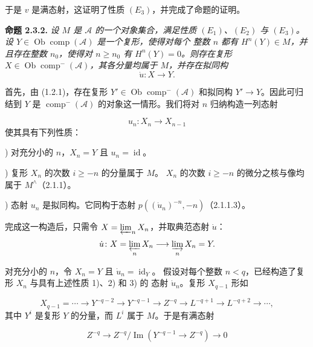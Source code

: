 \clearpage
{}%
\begingroup\small\setlength{\parskip}{0pt}\setlength{\emergencystretch}{1.5em}
\setlength{\abovedisplayskip}{4pt plus 2pt minus 2pt}%
\setlength{\belowdisplayskip}{4pt plus 2pt minus 2pt}%

于是 $v$ 是满态射，这证明了性质 $(E_3)$，并完成了命题的证明。

\medskip\noindent\textbf{命题 2.3.2.}
\textit{设 $M$ 是 $\mathcal A$ 的一个对象集合，满足性质
$(E_1)$、$(E_2)$ 与 $(E_3)$。设
$Y\in\operatorname{Ob}\operatorname{comp}(\mathcal A)$ 是一个复形，使得对每个
整数 $n$ 都有 $H^n(Y)\in M$，并且存在整数 $n_0$，使得对
$n\geq n_0$ 有 $H^n(Y)=0$。则存在复形
$X\in\operatorname{Ob}\operatorname{comp}^{-}(\mathcal A)$，其各分量均属于
$M$，并存在拟同构}
\[
\dot u\colon X\longrightarrow Y.
\]

首先，由 (1.2.1)，存在复形
$Y'\in\operatorname{Ob}\operatorname{comp}^{-}(\mathcal A)$ 和拟同构
$Y'\longrightarrow Y$。因此可归结到 $Y$ 是
$\operatorname{comp}^{-}(\mathcal A)$ 的对象这一情形。我们将对 $n$ 归纳构造一列态射

\[
u_n\colon X_n\longrightarrow X_{n-1}
\]
使其具有下列性质：

) 对充分小的 $n$，$X_n=Y$ 且 $u_n=\operatorname{id}$。

) 复形 $X_n$ 的次数 $i\geq -n$ 的分量属于 $M$。
$X_n$ 的次数 $i\geq -n$ 的微分之核与像均属于 $M^\wedge$（2.1.1）。

) 态射 $u_n$ 是拟同构。它同构于态射
$p((\dot u_n)^{-n},-n)$（2.1.1.3）。

完成这一构造后，只需令 $X=\varprojlim_n X_n$，并取典范态射
$\dot u$：
\[
\dot u\colon X=\varprojlim_n X_n\longrightarrow\varinjlim_n X_n=Y.
\]

对充分小的 $n$，令 $X_n=Y$ 且 $\dot u_n=\operatorname{id}_Y$。
假设对每个整数 $n<q$，已经构造了复形 $X_n$ 与具有上述性质 1)、2) 和 3) 的
态射 $\dot u_n$。复形 $X_{q-1}$ 形如

\[
X_{q-1}=\cdots\longrightarrow Y^{-q-2}\longrightarrow Y^{-q-1}
\longrightarrow Z^{-q}\longrightarrow L^{-q+1}\longrightarrow L^{-q+2}
\longrightarrow\cdots,
\]
其中 $Y^i$ 是复形 $Y$ 的分量，而 $L^i$ 属于 $M$。于是有满态射

\[
Z^{-q}\longrightarrow
Z^{-q}/\operatorname{Im}(Y^{-q-1}\longrightarrow Z^{-q})
\longrightarrow0
\]
\endgroup
